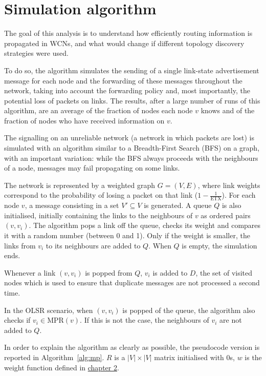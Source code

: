 \documentclass[a4paper,11pt,twoside,openright]{memoir}
\newcommand{\algref}[1] {Algorithm~\ref{#1}}
\newcommand{\etx}{\mathrm{ETX}}
\newcommand{\mpr}{\mathrm{MPR}}
\begin{document}
\section{Simulation algorithm}\label{simulation-algorithm}

The goal of this analysis is to understand how efficiently routing
information is propagated in WCNs, and what would change if different
topology discovery strategies were used.

To do so, the algorithm simulates the sending of a single
link-state advertisement message for each node and the forwarding of
these messages throughout the network, taking into account the forwarding
policy and, most importantly, the potential loss of packets on links.
The results, after a large number of runs of this algorithm, are an average
of the fraction of nodes each node $v$ knows and of the fraction of nodes
who have received information on $v$.

The signalling on an unreliable network (a network in which
packets are lost) is simulated with an algorithm similar to a Breadth-First
Search (BFS) on a graph, with an important variation: while the BFS
always proceeds with the neighbours of a node, messages may fail
propagating on some links.

The network is represented by a weighted graph $G=(V, E)$, where link
weights correspond to the probability of losing a packet on that link
($1 - \frac{1}{\etx}$). For each node $v$, a message consisting in a set
$V' \subseteq V$ is generated. A queue $Q$ is also initialised,
initially containing the links to the neighbours of $v$ as ordered pairs
$(v, v_i)$.
The algorithm pops a link off the queue, checks its weight and compares it
with a random number (between 0 and 1). Only if the weight is
smaller, the links from $v_i$ to its neighbours are added to $Q$.
When $Q$ is empty, the simulation ends.

Whenever a link $(v, v_i)$ is popped from $Q$, $v_i$ is added to $D$,
the set of visited nodes which is used to ensure that duplicate messages
are not processed a second time.

In the OLSR scenario, when $(v, v_i)$ is popped of the queue, the algorithm
also checks if $v_i \in \mpr(v)$. If this is not the case, the neighbours of
$v_i$ are not added to $Q$.

In order to explain the algorithm as clearly as possible, the pseudocode
version is reported in \algref{alg:mp}. $R$ is a $|V| \times |V|$ matrix
initialised with 0s, $w$ is the weight function defined in
\hyperref[network-topology-and-graphs]{chapter 2}.
\end{document}
